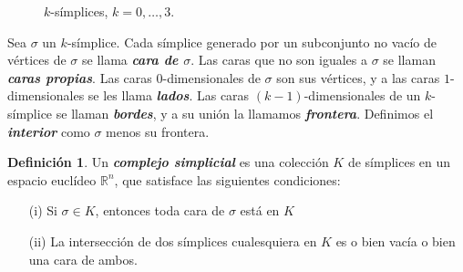 \documentclass[10pt]{report}
\newcommand{\R}{\mathbb{R}}
\newcommand{\enfatiza}[1]{\textbf{\textit{#1}}}
\theoremstyle{definition}
\newtheorem{defin}{Definición}[section]
\begin{document}
\begin{figure}
\centering
{}
\caption{$k$-símplices, $k=0,\dots ,3$.\label{fig:simplices}}
\end{figure}



Sea $\sigma$ un $k$-símplice. Cada símplice generado por un subconjunto no vacío de vértices de $\sigma$ se llama \enfatiza{cara de $\sigma$}. Las caras que no son iguales a $\sigma$ se llaman \enfatiza{caras propias}. Las caras $0$-dimensionales de $\sigma$ son sus vértices, y a las caras $1$-dimensionales se les llama \enfatiza{lados}. Las caras $(k-1)$-dimensionales de un $k$-símplice se llaman \enfatiza{bordes}, y a su unión la llamamos \enfatiza{frontera}. Definimos el \enfatiza{interior} como $\sigma$ menos su frontera. 


\begin{defin}%
Un \enfatiza{complejo simplicial} es una colección $K$ de símplices en un espacio euclídeo $\R ^n$, que satisface las siguientes condiciones:
\begin{itemize}
\item[(i)] Si $\sigma \in K $, entonces toda cara de $\sigma$ está en $K$
\item[(ii)] La intersección de dos símplices cualesquiera en $K$ es o bien vacía o bien una cara de ambos.
\end{itemize}
\label{def:complex}
\end{defin}
\end{document}
